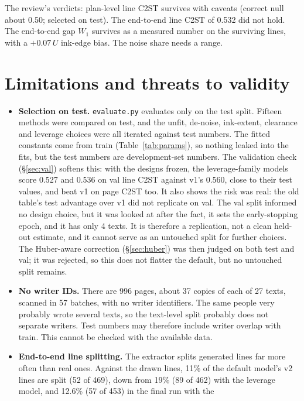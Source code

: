 \documentclass[11pt,a4paper]{article}
\newcommand{\U}{\ensuremath{U}}
\begin{document}
The review's verdicts: plan-level line C2ST survives with caveats (correct null
about 0.50; selected on test). The end-to-end line C2ST of 0.532 did not hold.
The end-to-end gap $W_1$ survives as a measured number on the surviving lines,
with a $+0.07\,\U$ ink-edge bias. The noise share needs a range.

\section{Limitations and threats to validity}
\label{sec:limits}
\begin{itemize}
\item \textbf{Selection on test.} \texttt{evaluate.py} evaluates only on the
  test split. Fifteen methods were compared on test, and the unfit, de-noise,
  ink-extent, clearance and leverage choices were all iterated against test
  numbers. The fitted constants come from train (Table~\ref{tab:params}), so
  nothing leaked into the fits, but the test numbers are development-set
  numbers. The validation check (\S\ref{sec:val}) softens this: with the
  designs frozen, the leverage-family models score 0.527 and 0.536 on val
  line C2ST against v1's 0.560, close to their test values, and beat v1 on
  page C2ST too. It also shows the risk was real: the old table's test
  advantage over v1 did not replicate on val. The val split informed no design
  choice, but it was looked at after the fact, it sets the early-stopping
  epoch, and it has only 4 texts. It is therefore a replication, not a clean
  held-out estimate, and it cannot serve as an untouched split for further
  choices. The Huber-aware correction (\S\ref{sec:huber}) was then judged
  on both test and val; it was rejected, so this does not flatter the
  default, but no untouched split remains.
\item \textbf{No writer IDs.} There are 996 pages, about 37 copies of each of
  27 texts, scanned in 57 batches, with no writer identifiers. The same people
  very probably wrote several texts, so the text-level split probably does not
  separate writers. Test numbers may therefore include writer overlap with
  train. This cannot be checked with the available data.
\item \textbf{End-to-end line splitting.} The extractor splits generated
  lines far more often than real ones. Against the drawn lines, 11\% of the
  default model's v2 lines are split (52 of 469), down from 19\% (89 of 462)
  with the leverage model, and 12.6\% (57 of 453) in the final run with the

\end{itemize}
\end{document}

